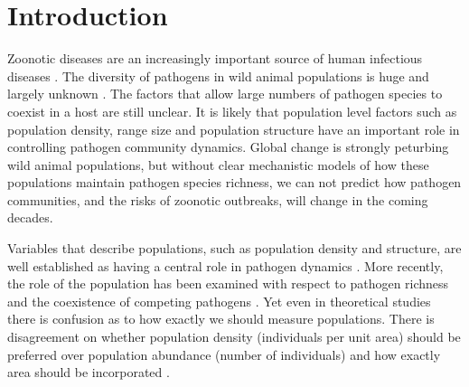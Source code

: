 







\section{Introduction}






Zoonotic diseases are an increasingly important source of human infectious diseases \cite{jones2008global, woolhouse2006host, taylor2001risk}.
The diversity of pathogens in wild animal populations is huge and largely unknown \cite{poulin2014parasite}.
The factors that allow large numbers of pathogen species to coexist in a host \cite{anthony2013strategy, anthony2013strategy} are still unclear.
It is likely that population level factors such as population density, range size and population structure have an important role in controlling pathogen community dynamics.
Global change is strongly peturbing wild animal populations, but without clear mechanistic models of how these populations maintain pathogen species richness, we can not predict how pathogen communities, and the risks of zoonotic outbreaks, will change in the coming decades.






Variables that describe populations, such as population density and structure, are well established as having a central role in pathogen dynamics \cite{colizza2007invasion, barthelemy2010fluctuation, colizza2007invasion,  wu2013threshold, may1979population, anderson1979population}.
More recently, the role of the population has been examined with respect to pathogen richness and the coexistence of competing pathogens \cite{qiu2013vector, allen2004sis, nunes2006localized}.
Yet even in theoretical studies there is confusion as to how exactly we should measure populations.
There is disagreement on whether population density (individuals per unit area) should be preferred over population abundance (number of individuals) \cite{begon2002clarification} and how exactly area should be incorporated \cite{begon2002clarification}. 


